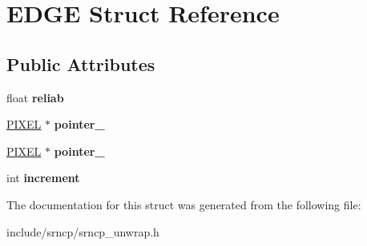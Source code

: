 \hypertarget{struct_e_d_g_e}{\section{E\-D\-G\-E Struct Reference}
\label{struct_e_d_g_e}
}
\subsection*{Public Attributes}
\begin{DoxyCompactItemize}
\item 
\hypertarget{struct_e_d_g_e_aeb147494099907a93ab92933235b5b2e}{float {\bfseries reliab}}\label{struct_e_d_g_e_aeb147494099907a93ab92933235b5b2e}

\item 
\hypertarget{struct_e_d_g_e_ab82d5a09f9a58543da71f2e8cbc821aa}{\hyperlink{struct_p_i_x_e_l}{P\-I\-X\-E\-L} $\ast$ {\bfseries pointer\-\_}}\label{struct_e_d_g_e_ab82d5a09f9a58543da71f2e8cbc821aa}

\item 
\hypertarget{struct_e_d_g_e_a06ed3287e2c03f8b13d94b0845e065db}{\hyperlink{struct_p_i_x_e_l}{P\-I\-X\-E\-L} $\ast$ {\bfseries pointer\-\_}}\label{struct_e_d_g_e_a06ed3287e2c03f8b13d94b0845e065db}

\item 
\hypertarget{struct_e_d_g_e_a29dca15549696bdc742e37df73de3482}{int {\bfseries increment}}\label{struct_e_d_g_e_a29dca15549696bdc742e37df73de3482}

\end{DoxyCompactItemize}


The documentation for this struct was generated from the following file\-:\begin{DoxyCompactItemize}
\item 
include/srncp/srncp\-\_\-unwrap.\-h\end{DoxyCompactItemize}
